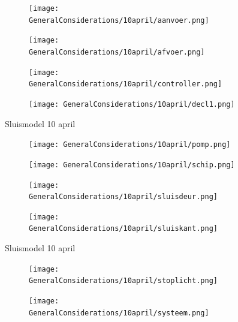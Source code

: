 \documentclass{article}
\begin{document}
	
	
	
	\begin{figure}
		\centering
		\begin{subfigure}{0.45\linewidth}
			\texttt{[image: GeneralConsiderations/10april/aanvoer.png]}
			\caption{}
			\label{fig:1a}
		\end{subfigure}\hfill
		\begin{subfigure}{0.45\linewidth}
			\texttt{[image: GeneralConsiderations/10april/afvoer.png]}
			\caption{}
			\label{fig:1a}
		\end{subfigure}
		
		\begin{subfigure}{0.45\linewidth}
			\texttt{[image: GeneralConsiderations/10april/controller.png]}
			\caption{}
			\label{fig:1a}
		\end{subfigure}\hfill
		\begin{subfigure}{0.45\linewidth}
			\texttt{[image: GeneralConsiderations/10april/decl1.png]}
			\caption{}
			\label{fig:1a}
		\end{subfigure}
		\caption{Sluismodel 10 april}
		\label{fig:1}
	\end{figure}
	
	
	
	
	\begin{figure}
		\centering
		\begin{subfigure}{0.45\linewidth}
			\texttt{[image: GeneralConsiderations/10april/pomp.png]} 
			\caption{}
			\label{fig:1a}
		\end{subfigure}\hfill
		\begin{subfigure}{0.45\linewidth}
			\texttt{[image: GeneralConsiderations/10april/schip.png]}
			\caption{}
			\label{fig:1a}
		\end{subfigure}
		
		\begin{subfigure}{0.45\linewidth}
			\texttt{[image: GeneralConsiderations/10april/sluisdeur.png]}
			\caption{}
			\label{fig:1a}
		\end{subfigure}\hfill
		\begin{subfigure}{0.45\linewidth}
			\texttt{[image: GeneralConsiderations/10april/sluiskant.png]}
			\caption{}
			\label{fig:1a}
		\end{subfigure}
		\caption{Sluismodel 10 april}
		\label{fig:1}
	\end{figure}
	
	
	\begin{figure}
		\centering
		\begin{subfigure}{0.45\linewidth}
			\texttt{[image: GeneralConsiderations/10april/stoplicht.png]}
			\caption{}
			\label{fig:1a}
		\end{subfigure}\hfill
		\begin{subfigure}{0.45\linewidth}
			\texttt{[image: GeneralConsiderations/10april/systeem.png]}
			\caption{}
			\label{fig:1a}
		\end{subfigure}
	\end{figure}
	
\end{document}
